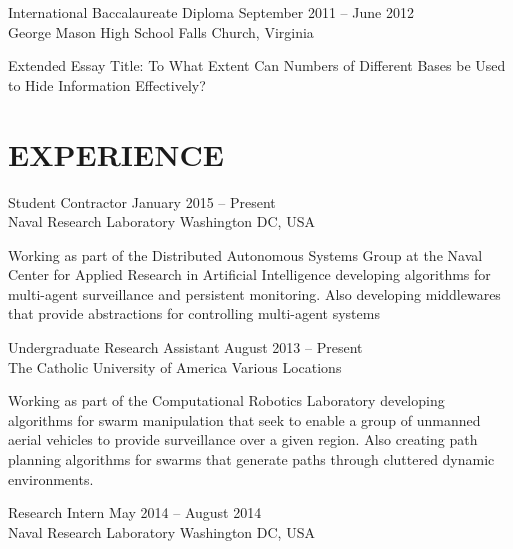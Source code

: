 \documentclass[line,margin]{cv}
\begin{document}
\begin{resume}
\begin{adjustwidth}{2.5em}{2.5em}
\end{adjustwidth}

International Baccalaureate Diploma
\hfill September 2011 -- June 2012 \\
George Mason High School \hfill Falls Church, Virginia
\begin{adjustwidth}{2.5em}{2.5em}

    Extended Essay Title: To What Extent Can Numbers of Different Bases be Used
    to Hide Information Effectively?

\end{adjustwidth}

\section{EXPERIENCE}

Student Contractor
\hfill January 2015 -- Present \\
Naval Research Laboratory \hfill Washington DC, USA

\begin{adjustwidth}{2.5em}{2.5em}

    Working as part of the Distributed Autonomous Systems Group at the Naval
    Center for Applied Research in Artificial Intelligence developing
    algorithms for multi-agent surveillance and persistent monitoring. Also
    developing middlewares that provide abstractions for controlling
    multi-agent systems

\end{adjustwidth}

Undergraduate Research Assistant
\hfill August 2013 -- Present \\
The Catholic University of America \hfill Various Locations

\begin{adjustwidth}{2.5em}{2.5em}

    Working as part of the Computational Robotics Laboratory developing
    algorithms for swarm manipulation that seek to enable a group of unmanned
    aerial vehicles to provide surveillance over a given region. Also creating
    path planning algorithms for swarms that generate paths through cluttered
    dynamic environments.

\end{adjustwidth}

Research Intern
\hfill May 2014 -- August 2014 \\
Naval Research Laboratory \hfill Washington DC, USA

\begin{adjustwidth}{2.5em}{2.5em}


\end{adjustwidth}
\end{resume}
\end{document}
